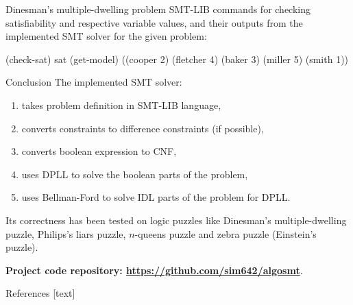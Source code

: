 \documentclass{beamer}
\begin{document}
\begin{frame}[fragile,t]
\begin{columns}[t,onlytextwidth]
\begin{column}{0.485\textwidth}
\begin{block}{Dinesman's multiple-dwelling problem}
			SMT-LIB commands for checking satisfiability and respective variable values, and their outputs from the implemented SMT solver for the given problem:
			\begin{smtlib}
				(check-sat)
				sat
				(get-model)
				((cooper 2) (fletcher 4) (baker 3) (miller 5) (smith 1))
			\end{smtlib}
		\end{block}
	
		\begin{block}{Conclusion}
			The implemented SMT solver:
			\begin{enumerate}
				\item takes problem definition in SMT-LIB language,
				\item converts constraints to difference constraints (if possible),
				\item converts boolean expression to CNF,
				\item uses DPLL to solve the boolean parts of the problem,
				\item uses Bellman-Ford to solve IDL parts of the problem for DPLL.
			\end{enumerate}

			Its correctness has been tested on logic puzzles like Dinesman's multiple-dwelling puzzle, Philips's liars puzzle, $n$-queens puzzle and zebra puzzle (Einstein's puzzle).

			\textbf{Project code repository: \url{https://github.com/sim642/algosmt}}.
		\end{block}
	
		\begin{block}{References}
			[text]
			\printbibliography[heading=none]
		\end{block}
	\end{column}
\end{columns}

%

\end{frame}
\end{document}
